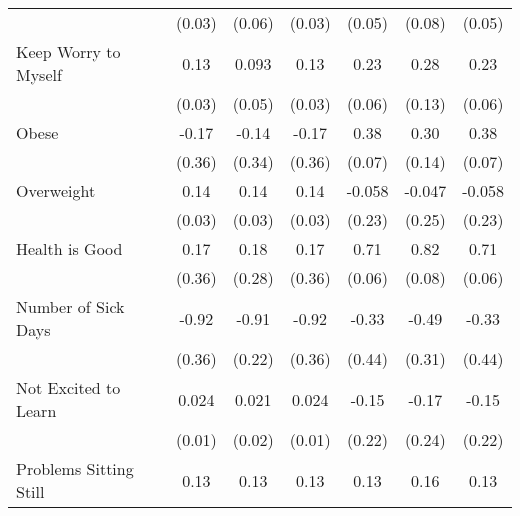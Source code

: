 {\begin{tabular}{l*{6}{c}}
            &      (0.03)         &      (0.06)         &      (0.03)         &      (0.05)         &      (0.08)         &      (0.05)         \\
\addlinespace
Keep Worry to Myself&        0.13\sym{***}&       0.093         &        0.13\sym{***}&        0.23\sym{***}&        0.28\sym{*}  &        0.23\sym{***}\\
            &      (0.03)         &      (0.05)         &      (0.03)         &      (0.06)         &      (0.13)         &      (0.06)         \\
\addlinespace
Obese       &       -0.17         &       -0.14         &       -0.17         &        0.38\sym{***}&        0.30\sym{*}  &        0.38\sym{***}\\
            &      (0.36)         &      (0.34)         &      (0.36)         &      (0.07)         &      (0.14)         &      (0.07)         \\
\addlinespace
Overweight  &        0.14\sym{***}&        0.14\sym{***}&        0.14\sym{***}&      -0.058         &      -0.047         &      -0.058         \\
            &      (0.03)         &      (0.03)         &      (0.03)         &      (0.23)         &      (0.25)         &      (0.23)         \\
\addlinespace
Health is Good&        0.17         &        0.18         &        0.17         &        0.71\sym{***}&        0.82\sym{***}&        0.71\sym{***}\\
            &      (0.36)         &      (0.28)         &      (0.36)         &      (0.06)         &      (0.08)         &      (0.06)         \\
\addlinespace
Number of Sick Days&       -0.92\sym{*}  &       -0.91\sym{***}&       -0.92\sym{*}  &       -0.33         &       -0.49         &       -0.33         \\
            &      (0.36)         &      (0.22)         &      (0.36)         &      (0.44)         &      (0.31)         &      (0.44)         \\
\addlinespace
Not Excited to Learn&       0.024\sym{*}  &       0.021         &       0.024\sym{*}  &       -0.15         &       -0.17         &       -0.15         \\
            &      (0.01)         &      (0.02)         &      (0.01)         &      (0.22)         &      (0.24)         &      (0.22)         \\
\addlinespace
Problems Sitting Still&        0.13\sym{***}&        0.13\sym{***}&        0.13\sym{***}&        0.13\sym{**} &        0.16         &        0.13\sym{**} \\

\end{tabular}}
